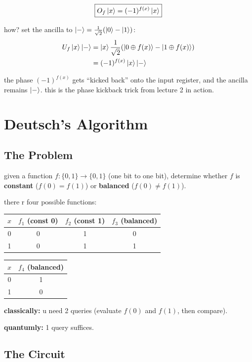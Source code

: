 \documentclass[11pt,a4paper]{article}
\theoremstyle{definition}
\theoremstyle{remark}
\begin{document}
\[
\boxed{O_f\ket{x} = (-1)^{f(x)}\ket{x}}
\]

how? set the ancilla to $\ket{-} = \frac{1}{\sqrt{2}}(\ket{0} - \ket{1})$:
\begin{align}
U_f\ket{x}\ket{-} &= \ket{x}\frac{1}{\sqrt{2}}(\ket{0 \oplus f(x)} - \ket{1 \oplus f(x)}) \\
&= (-1)^{f(x)}\ket{x}\ket{-}
\end{align}

the phase $(-1)^{f(x)}$ gets ``kicked back'' onto the input register, and the ancilla remains $\ket{-}$. this is the phase kickback trick from lecture 2 in action.

\section{Deutsch's Algorithm}

\subsection{The Problem}

given a function $f: \{0,1\} \to \{0,1\}$ (one bit to one bit), determine whether $f$ is \textbf{constant} ($f(0) = f(1)$) or \textbf{balanced} ($f(0) \neq f(1)$).

there r four possible functions:
\begin{center}
\begin{tabular}{c|c|c|c}
$x$ & $f_1$ (const 0) & $f_2$ (const 1) & $f_3$ (balanced) \\
\hline
0 & 0 & 1 & 0 \\
1 & 0 & 1 & 1
\end{tabular}
\hspace{0.5cm}
\begin{tabular}{c|c}
$x$ & $f_4$ (balanced) \\
\hline
0 & 1 \\
1 & 0
\end{tabular}
\end{center}

\textbf{classically:} u need 2 queries (evaluate $f(0)$ and $f(1)$, then compare).

\textbf{quantumly:} 1 query suffices.

\subsection{The Circuit}
\end{document}
